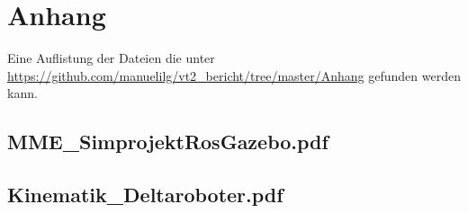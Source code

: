 \chapter{Anhang}
Eine Auflistung der Dateien die unter \url{https://github.com/manuelilg/vt2\_bericht/tree/master/Anhang} gefunden werden kann.
\section{MME\_SimprojektRosGazebo.pdf} \label{ap:MME-Bericht}
\section{Kinematik\_Deltaroboter.pdf} \label{ap:kin-delta}
